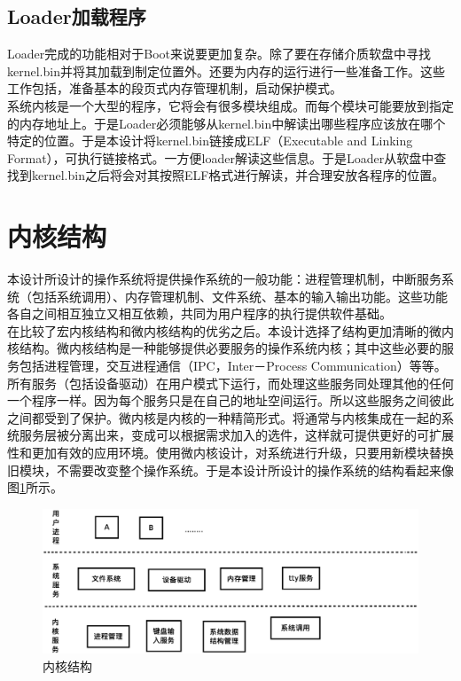 \documentclass[UTF8,nofonts,cs4size]{ctexrep}
\begin{document}
\subsection{Loader加载程序}
Loader完成的功能相对于Boot来说要更加复杂。除了要在存储介质软盘中寻找kernel.bin并将其加载到制定位置外。还要为内存的运行进行一些准备工作。这些工作包括，准备基本的段页式内存管理机制，启动保护模式。
\\
\indent 
系统内核是一个大型的程序，它将会有很多模块组成。而每个模块可能要放到指定的内存地址上。于是Loader必须能够从kernel.bin中解读出哪些程序应该放在哪个特定的位置。于是本设计将kernel.bin链接成ELF（Executable and Linking Format），可执行链接格式。一方便loader解读这些信息。于是Loader从软盘中查找到kernel.bin之后将会对其按照ELF格式进行解读，并合理安放各程序的位置。

\section{内核结构}
本设计所设计的操作系统将提供操作系统的一般功能：进程管理机制，中断服务系统（包括系统调用）、内存管理机制、文件系统、基本的输入输出功能。这些功能各自之间相互独立又相互依赖，共同为用户程序的执行提供软件基础。
\\
\indent  
在比较了宏内核结构和微内核结构的优劣之后。本设计选择了结构更加清晰的微内核结构。微内核结构是一种能够提供必要服务的操作系统内核；其中这些必要的服务包括进程管理，交互进程通信（IPC，Inter－Process Communication）等等。所有服务（包括设备驱动）在用户模式下运行，而处理这些服务同处理其他的任何一个程序一样。因为每个服务只是在自己的地址空间运行。所以这些服务之间彼此之间都受到了保护。微内核是内核的一种精简形式。将通常与内核集成在一起的系统服务层被分离出来，变成可以根据需求加入的选件，这样就可提供更好的可扩展性和更加有效的应用环境。使用微内核设计，对系统进行升级，只要用新模块替换旧模块，不需要改变整个操作系统。于是本设计所设计的操作系统的结构看起来像图\ref{osstruct}所示。
\begin{figure}[htp]
\centering
\includegraphics[scale=0.38]{osstruct.eps}
\caption{内核结构}
\label{osstruct}
\end{figure}
\end{document}
